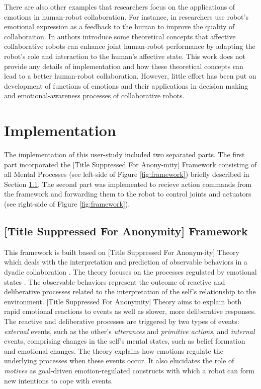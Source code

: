 \documentclass{sig-alternate-05-2015}
\begin{document}
There are also other examples that researchers focus on the applications of
emotions in human-robot collaboration. For instance, in
\cite{guha:emotion-feedback} researchers use robot's emotional expression as a
feedback to the human to improve the quality of collaboraiton. In
\cite{looije:affective-collaboration-safety} authors introduce some theoretical
concepts that affective collaborative robots can enhance joint human-robot
performance by adapting the robot's role and interaction to the human's
affective state. This work does not provide any details of implementation and
how these theoretical concepts can lead to a better human-robot collaboration.
However, little effort has been put on development of functions of emotions and
their applications in decision making and emotional-awareness processes of
collaborative robots.

\section{Implementation}
The implementation of this user-study included two separated parts. The first
part incorporated the [Title Suppressed For Anony-mity] Framework consisting of
all Mental Processes (see left-side of Figure \ref{fig:framework}) briefly
described in Section \ref{sec:theory}. The second part was implemented to
recieve action commands from the framework and forwarding them to the robot to
control joints and actuators (see right-side of Figure \ref{fig:framework}).

\subsection{[Title Suppressed For Anonymity] Framework}
\label{sec:theory}
This framework is built based on [Title Suppressed For Anonym-ity] Theory which
deals with the interpretation and prediction of observable behaviors in a dyadic
collaboration \cite{shayganfar:theory-overview}. The theory focuses on the
processes regulated by emotional states \cite{shayganfar:goal-management}. The
observable behaviors represent the outcome of reactive and deliberative
processes related to the interpretation of the self's relationship to the
environment. [Title Suppressed For Anonymity] Theory aims to explain both rapid
emotional reactions to events as well as slower, more deliberative responses.
The reactive and deliberative processes are triggered by two types of events:
\textit{external} events, such as the other's \textit{utterances} and
\textit{primitive actions}, and \textit{internal} events, comprising changes in
the self's mental states, such as belief formation and emotional changes. The
theory explains how emotions regulate the underlying processes when these events
occur. It also elucidates the role of \textit{motives} as goal-driven
emotion-regulated constructs with which a robot can form new intentions to cope
with events.
\end{document}
